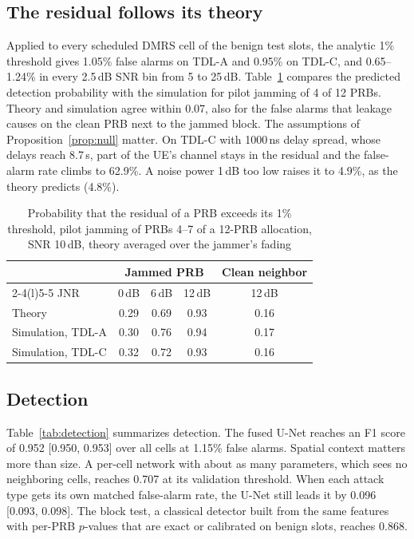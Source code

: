 \documentclass[conference]{IEEEtran}
\newenvironment{conly}{\par\color{Conly}}{\par}
\begin{document}
\ifstoryC
\begin{conly}
\subsection{The residual follows its theory}
\label{sec:theory}
Applied to every scheduled DMRS cell of the benign test slots, the analytic 1\% threshold gives
1.05\% false alarms on TDL-A and 0.95\% on TDL-C, and 0.65--1.24\% in every 2.5\,dB SNR bin
from 5 to 25\,dB. Table~\ref{tab:theory} compares the predicted detection probability with the
simulation for pilot jamming of 4 of 12 PRBs. Theory and simulation agree within 0.07, also for
the false alarms that leakage causes on the clean PRB next to the jammed block. The assumptions of
Proposition~\ref{prop:null} matter. On TDL-C with 1000\,ns delay spread, whose delays reach
8.7\,\textmu s, part of the UE's channel stays in the residual and the false-alarm rate climbs
to 62.9\%. A noise power 1\,dB too low raises it to 4.9\%, as the theory predicts (4.8\%).

\begin{table}[t]
\caption{Probability that the residual of a PRB exceeds its 1\% threshold, pilot jamming of PRBs
4--7 of a 12-PRB allocation, SNR 10\,dB, theory averaged over the jammer's fading}
\label{tab:theory}
\centering
\footnotesize
\begin{tabular}{@{}lcccc@{}}
\toprule
 & \multicolumn{3}{c}{Jammed PRB} & Clean neighbor \\
\cmidrule(lr){2-4}\cmidrule(l){5-5}
JNR & 0\,dB & 6\,dB & 12\,dB & 12\,dB \\
\midrule
Theory & 0.29 & 0.69 & 0.93 & 0.16 \\
Simulation, TDL-A & 0.30 & 0.76 & 0.94 & 0.17 \\
Simulation, TDL-C & 0.32 & 0.72 & 0.93 & 0.16 \\
\bottomrule
\end{tabular}
\end{table}
\end{conly}
\fi

\subsection{Detection}
Table~\ref{tab:detection} summarizes detection. The fused U-Net reaches an F1 score of 0.952
[0.950, 0.953] over all cells at 1.15\% false alarms. Spatial context matters more than size. A
per-cell network with about as many parameters, which sees no neighboring cells, reaches 0.707 at
its validation threshold. When each attack type gets its own matched false-alarm rate, the U-Net
still leads it by 0.096 [0.093, 0.098]. The block test, a classical detector built from the same
features with per-PRB $p$-values that are exact or calibrated on benign slots, reaches 0.868.
\end{document}
